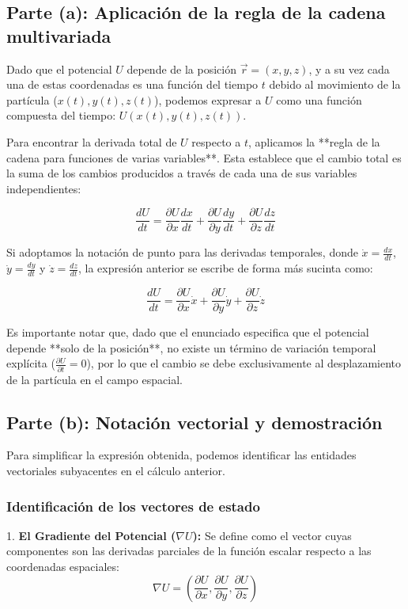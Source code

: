 \documentclass[a4paper]{article}
\begin{document}
\subsection{Parte (a): Aplicación de la regla de la cadena multivariada}

Dado que el potencial $U$ depende de la posición $\vec{r} = (x, y, z)$, y a su vez cada una de estas coordenadas es una función del tiempo $t$ debido al movimiento de la partícula ($x(t), y(t), z(t)$), podemos expresar a $U$ como una función compuesta del tiempo: $U(x(t), y(t), z(t))$.

Para encontrar la derivada total de $U$ respecto a $t$, aplicamos la **regla de la cadena para funciones de varias variables**. Esta establece que el cambio total es la suma de los cambios producidos a través de cada una de sus variables independientes:

$$ \frac{dU}{dt} = \frac{\partial U}{\partial x} \frac{dx}{dt} + \frac{\partial U}{\partial y} \frac{dy}{dt} + \frac{\partial U}{\partial z} \frac{dz}{dt} $$

Si adoptamos la notación de punto para las derivadas temporales, donde $\dot{x} = \frac{dx}{dt}$, $\dot{y} = \frac{dy}{dt}$ y $\dot{z} = \frac{dz}{dt}$, la expresión anterior se escribe de forma más sucinta como:

$$ \frac{dU}{dt} = \frac{\partial U}{\partial x} \dot{x} + \frac{\partial U}{\partial y} \dot{y} + \frac{\partial U}{\partial z} \dot{z} $$

Es importante notar que, dado que el enunciado especifica que el potencial depende **solo de la posición**, no existe un término de variación temporal explícita ($\frac{\partial U}{\partial t} = 0$), por lo que el cambio se debe exclusivamente al desplazamiento de la partícula en el campo espacial.

\subsection{Parte (b): Notación vectorial y demostración}

Para simplificar la expresión obtenida, podemos identificar las entidades vectoriales subyacentes en el cálculo anterior.

\subsubsection{Identificación de los vectores de estado}

1. \textbf{El Gradiente del Potencial ($\nabla U$):} Se define como el vector cuyas componentes son las derivadas parciales de la función escalar respecto a las coordenadas espaciales:
$$ \nabla U = \left( \frac{\partial U}{\partial x}, \frac{\partial U}{\partial y}, \frac{\partial U}{\partial z} \right) $$
\end{document}
